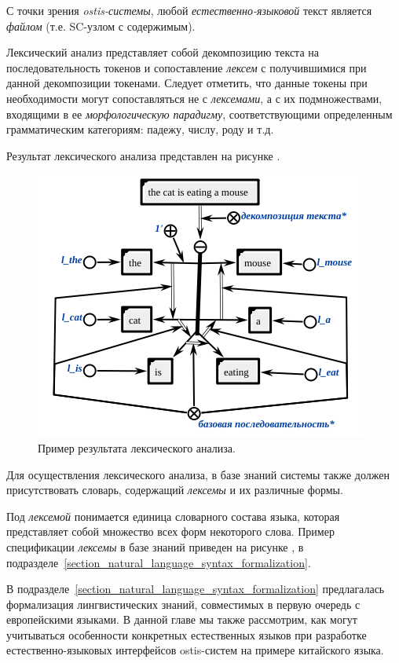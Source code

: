 С точки зрения \textit{ostis-системы}, любой \textit{естественно-языковой} текст является \textit{файлом} (т.е. SC-узлом с содержимым).

Лексический анализ представляет собой декомпозицию текста на последовательность токенов и сопоставление \textit{лексем} с получившимися при данной декомпозиции токенами.
Следует отметить, что данные токены при необходимости могут сопоставляться не с \textit{лексемами}, а с их подмножествами, входящими в ее \textit{морфологическую парадигму}, соответствующими определенным грамматическим категориям: падежу, числу, роду и т.д.

Результат лексического анализа представлен на рисунке \textit{}.

\begin{figure}[h]
    \centering
    \includegraphics[scale=0.8]{images/part4/chapter_nl_interfaces/lexical}
    \caption{Пример результата лексического анализа.}
    \label{fig:lexical_result}
\end{figure}

Для осуществления лексического анализа, в базе знаний системы также должен присутствовать словарь, содержащий \textit{лексемы} и их различные формы.

Под \textit{лексемой} понимается единица словарного состава языка, которая представляет собой множество всех форм некоторого слова.
Пример спецификации \textit{лексемы} в базе знаний приведен на рисунке \textit{}, в подразделе~\ref{section_natural_language_syntax_formalization}.

В подразделе~\ref{section_natural_language_syntax_formalization} предлагалась формализация лингвистических знаний, совместимых в первую очередь с европейскими языками. В данной главе мы также рассмотрим, как могут учитываться особенности конкретных естественных языков при разработке естественно-языковых интерфейсов ostis-систем на примере китайского языка.

